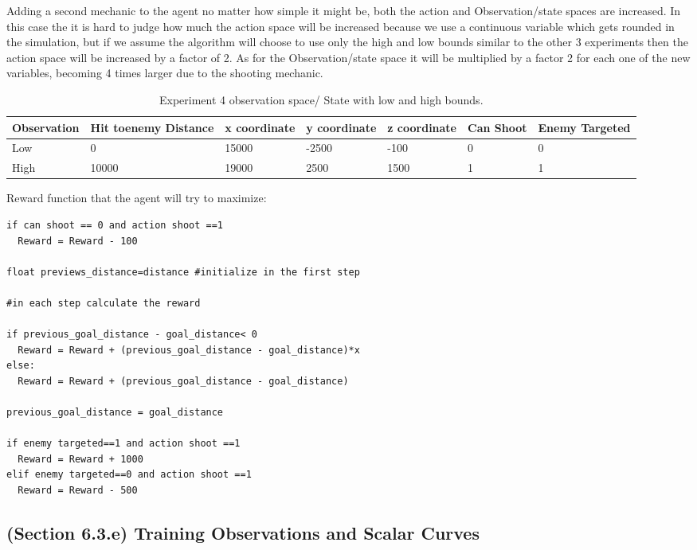 \documentclass[a4paper,one side,12pt]{book}
\begin{document}
Adding a second mechanic to the agent no matter how simple it might be, both the action and Observation/state spaces are increased. 
In this case the it is hard to judge how much the action space will be increased because we use a continuous variable which gets rounded in the simulation, but if we assume the algorithm will choose to use only the high and low bounds similar to the other 3 experiments then the action space will be increased by a factor of 2.
As for the Observation/state space it will be multiplied by a factor 2 for each one of the new variables, becoming 4 times larger due to the shooting mechanic.
\begin{table}[H]
  \centering  
  \begin{tabular}
  {|m{5em}||m{3.5em}||m{5em}||m{5em}||m{5em}||m{2.5em}||m{3.5em}|}
  \hline
       Observation &Hit to\newline enemy Distance &x coordinate &y coordinate &z coordinate &Can Shoot &Enemy Targeted\\
  \hline    
  \hline       					
Low	&0 &15000 &-2500 &-100 &0 &0\\
\hline   
High &10000 &19000 &2500 &1500 &1 &1\\

       \hline
  \end{tabular}
  \caption{Experiment 4 observation space/ State with low and high bounds.}
\end{table} 

Reward function that the agent will try to maximize:

\begin{verbatim}
if can shoot == 0 and action shoot ==1 
  Reward = Reward - 100

float previews_distance=distance #initialize in the first step

#in each step calculate the reward

if previous_goal_distance - goal_distance< 0
  Reward = Reward + (previous_goal_distance - goal_distance)*x
else:
  Reward = Reward + (previous_goal_distance - goal_distance)

previous_goal_distance = goal_distance

if enemy targeted==1 and action shoot ==1 
  Reward = Reward + 1000
elif enemy targeted==0 and action shoot ==1 
  Reward = Reward - 500

\end{verbatim}


\subsection{(Section 6.3.e) Training Observations and Scalar Curves}
\end{document}
